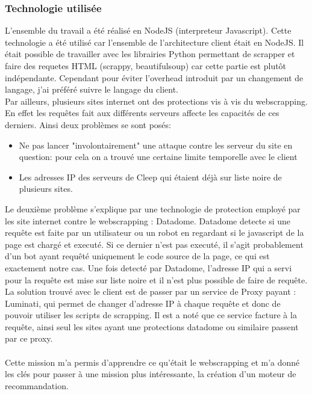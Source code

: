 \documentclass{article} %
\begin{document}
\subsubsection{Technologie utilisée\\}
L'ensemble du travail a été réalisé en NodeJS (interpreteur Javascript). Cette technologie a été utilisé car l'ensemble de l'architecture client était en NodeJS. Il était possible de travailler avec les librairies Python permettant de scrapper et faire des requetes HTML (scrappy, beautifulsoup) car cette partie est plutôt indépendante. Cependant pour éviter l'overhead introduit par un changement de langage, j'ai préféré suivre le langage du client.\\
Par ailleurs, plusieurs sites internet ont des protections vis à vis du webscrapping. En effet les requêtes fait aux différents serveurs affecte les capacités de ces derniers. Ainsi deux problèmes se sont posés:
\begin{itemize}
	\itemsep 0em
	\item Ne pas lancer "involontairement" une attaque contre les serveur du site en question: pour cela on a trouvé une certaine limite temporelle avec le client
	\item Les adresses IP des serveurs de Cleep qui étaient déjà sur liste noire de plusieurs sites.
\end{itemize}

Le deuxième problème s'explique par une technologie de protection employé par les site internet contre le webscrapping : Datadome. Datadome detecte si une requête est faite par un utilisateur ou un robot en regardant si le javascript de la page est chargé et executé. Si ce dernier n'est pas executé, il s'agit probablement d'un bot ayant requêté uniquement le code source de la page, ce qui est exactement notre cas. Une fois detecté par Datadome, l'adresse IP qui a servi pour la requête est mise sur liste noire et il n'est plus possible de faire de requête.\\

La solution trouvé avec le client est de passer par un service de Proxy payant : Luminati, qui permet de changer d'adresse IP à chaque requête et donc de pouvoir utiliser les scripts de scrapping. Il est a noté que ce service facture à la requête, ainsi seul les sites ayant une protections datadome ou similaire passent par ce proxy.\\ \\

Cette mission m'a permis d'apprendre ce qu'était le webscrapping et m'a donné les clés pour passer à une mission plus intéressante, la création d'un moteur de recommandation.
\end{document}
